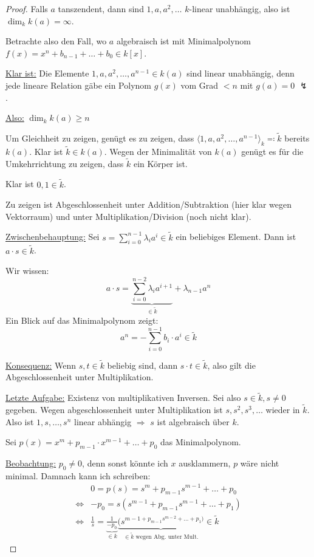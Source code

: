 \documentclass[12pt,parskip=full]{scrartcl}
\newcommand{\heading}{\underline}
\theoremstyle{definition}
\theoremstyle{remark}
\begin{document}
	\begin{proof}
		Falls $a$ tanszendent, dann sind $1,a,a^2,\dots$ $k$-linear unabhängig, also ist $\dim_k k(a) = \infty$.
		
		Betrachte also den Fall, wo $a$ algebraisch ist mit Minimalpolynom $f(x) = x^n + b_{n-1} + \dots + b_0 \in k[x]$.
		
		\heading{Klar ist:} Die Elemente $1,a,a^2, \dots, a^{n-1} \in k(a)$ sind linear unabhängig, denn jede lineare Relation gäbe ein Polynom $g(x)$ vom Grad $< n$ mit $g(a) = 0$ $\lightning$.
		
		\heading{Also:} $\dim_k k(a) \geq n$
		
		Um Gleichheit zu zeigen, genügt es zu zeigen, dass $\langle 1, a, a^2, \dots, a^{n-1} \rangle_k \eqqcolon \tilde{k}$ bereits $k(a)$. Klar ist $\tilde{k} \in k(a)$. Wegen der Minimalität von $k(a)$ genügt es für die Umkehrrichtung zu zeigen, dass $\tilde{k}$ ein Körper ist.
		
		Klar ist $0,1 \in \tilde{k}$.
		
		Zu zeigen ist Abgeschlossenheit unter Addition/Subtraktion (hier klar wegen Vektorraum) und unter Multiplikation/Division (noch nicht klar).
		
		\heading{Zwischenbehauptung:} Sei $s = \sum_{i=0}^{n-1} \lambda_i a^i \in \tilde{k}$ ein beliebiges Element. Dann ist $a \cdot s \in \tilde{k}$.
		
		Wir wissen:
		\begin{equation*}
			a \cdot s = \underbrace{\sum_{i=0}^{n-2} \lambda_i a^{i+1}}_{\in \tilde{k}} + \lambda_{n-1} a^n
		\end{equation*}
		Ein Blick auf das Minimalpolynom zeigt:
		\begin{equation*}
			a^n = - \sum_{i = 0}^{n-1} b_i \cdot a^i \in \tilde{k}
		\end{equation*}
		
		\heading{Konsequenz:} Wenn $s,t \in \tilde{k}$ beliebig sind, dann $s \cdot t \in \tilde{k}$, also gilt die Abgeschlossenheit unter Multiplikation.
		
		\heading{Letzte Aufgabe:} Existenz von multiplikativen Inversen. Sei also $s \in \tilde{k}, s \neq 0$ gegeben. Wegen abgeschlossenheit unter Multiplikation ist $s, s^2, s^3, \dots$ wieder in $\tilde{k}$. Also ist $1,s, \dots, s^n$ linear abhängig $\Rightarrow$ $s$ ist algebraisch über $k$.
		
		Sei $p(x) = x^m + p_{m-1} \cdot x^{m-1} + \dots + p_0$ das Minimalpolynom.
		
		\heading{Beobachtung:} $p_0 \neq 0$, denn sonst könnte ich $x$ ausklammern, $p$ wäre nicht minimal. Damnach kann ich schreiben:
		\begin{align*}
			&0 = p(s) = s^m + p_{m-1} s^{m-1} + \dots + p_0 \\
			\Leftrightarrow& - p_0 = s(s^{m-1} + p_{m-1} s^{m-1} + \dots + p_1) \\
			\Leftrightarrow& \frac{1}{s} = \underbrace{\frac{1}{-p_0}}_{\in k} \underbrace{(s^{m-1 + p_{m-1} s^{m-2} + \dots + p_1)}}_{\in \tilde{k} \text{ wegen Abg. unter Mult.}} \in \tilde{k}
		\end{align*}
	\end{proof}
\end{document}
